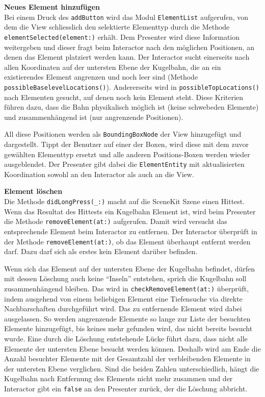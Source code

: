\textbf{Neues Element hinzufügen} \\
Bei einem Druck des \texttt{addButton} wird das Modul \texttt{ElementList} aufgerufen, von dem die View schliesslich den selektierte Elementtyp durch die Methode \texttt{elementSelected(element:)} erhält.
Dem Presenter wird diese Information weitergeben und dieser fragt beim Interactor nach den möglichen Positionen, an denen das Element platziert werden kann.
Der Interactor sucht einerseits nach allen Koordinaten auf der untersten Ebene der Kugelbahn, die an ein existierendes Element angrenzen und noch leer sind (Methode \texttt{possibleBaselevelLocations()}).
Andererseits wird in \texttt{possibleTopLocations()} nach Elementen gesucht, auf denen noch kein Element steht.
Diese Kriterien führen dazu, dass die Bahn physikalisch möglich ist (keine schwebeden Elemente) und zusammenhängend ist (nur angrenzende Positionen).

All diese Positionen werden als \texttt{BoundingBoxNode} der View hinzugefügt und dargestellt.
Tippt der Benutzer auf einer der Boxen, wird diese mit dem zuvor gewählten Elementtyp ersetzt und alle anderen Positions-Boxen werden wieder ausgeblendet.
Der Presenter gibt dabei die \texttt{ElementEntity} mit aktualisierten Koordination sowohl an den Interactor als auch an die View.

\textbf{Element löschen} \\
Die Methode \texttt{didLongPress(\_:)} macht auf die SceneKit Szene einen Hittest.
Wenn das Resultat des Hittests ein Kugelbahn Element ist, wird beim Presenter die Methode \texttt{removeElement(at:)} aufgerufen.
Damit wird versucht das entsprechende Element beim Interactor zu entfernen.
Der Interactor überprüft in der Methode \texttt{removeElement(at:)}, ob das Element überhaupt entfernt werden darf.
Dazu darf sich als erstes kein Element darüber befinden.

Wenn sich das Element auf der untersten Ebene der Kugelbahn befindet, dürfen mit dessen Löschung auch keine "`Inseln"' entstehen, sprich die Kugelbahn soll zusammenhängend bleiben.
Das wird in \texttt{checkRemoveElement(at:)} überprüft, indem ausgehend von einem beliebigen Element eine Tiefensuche via direkte Nachbarschaften durchgeführt wird.
Das zu entfernende Element wird dabei ausgelassen.
So werden angrenzende Elemente so lange zur Liste der besuchten Elemente hinzugefügt, bis keines mehr gefunden wird, das nicht bereits besucht wurde.
Eine durch die Löschung entstehende Lücke führt dazu, dass nicht alle Elemente der untersten Ebene besucht werden können.
Deshalb wird am Ende die Anzahl besuchter Elemente mit der Gesamtzahl der verbleibenden Elemente in der untersten Ebene verglichen.
Sind die beiden Zahlen unterschiedlich, hängt die Kugelbahn nach Entfernung des Elements nicht mehr zusammen und der Interactor gibt ein \texttt{false} an den Presenter zurück, der die Löschung abbricht.

